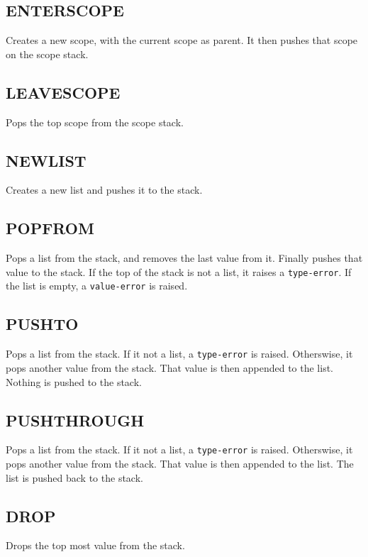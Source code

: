 \subsection{ENTER\textunderscore{}SCOPE}
\label{sec:enterscope}
Creates a new scope, with the current scope as parent. It then pushes
that scope on the scope stack.

\subsection{LEAVE\textunderscore{}SCOPE}
\label{sec:leavescope}
Pops the top scope from the scope stack.

\subsection{NEW\textunderscore{}LIST}
\label{sec:newlist}
Creates a new list and pushes it to the stack.

\subsection{POP\textunderscore{}FROM}
\label{sec:popfrom}
Pops a list from the stack, and removes the last value from it. Finally
pushes that value to the stack. If the top of the stack is not a list,
it raises a \verb!type-error!. If the list is empty, a
\verb!value-error! is raised.

\subsection{PUSH\textunderscore{}TO}
\label{sec:pushto}
Pops a list from the stack. If it not a list, a \verb!type-error! is
raised. Otherswise, it pops another value from the stack. That value
is then appended to the list. Nothing is pushed to the stack.

\subsection{PUSH\textunderscore{}THROUGH}
\label{sec:pushthrough}
Pops a list from the stack. If it not a list, a \verb!type-error! is
raised. Otherswise, it pops another value from the stack. That value
is then appended to the list. The list is pushed back to the stack.

\subsection{DROP}
\label{sec:drop}
Drops the top most value from the stack.

